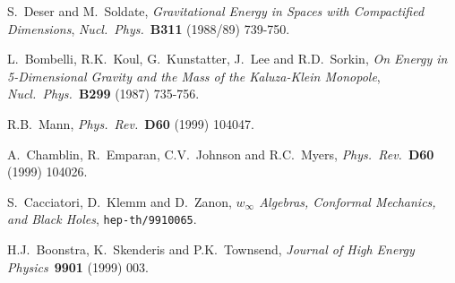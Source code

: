 \documentclass[12pt,a4paper]{article}
\begin{document}
\begin{thebibliography}{99}


 S.~Deser and M.~Soldate,
                {\sl Gravitational Energy in Spaces with Compactified
                Dimensions},
                {\it Nucl.~Phys.}~{\bf B311} (1988/89) 739-750. 

 L.~Bombelli, R.K.~Koul, G.~Kunstatter, 
                   J.~Lee and R.D.~Sorkin,
                   {\sl On Energy in 5-Dimensional Gravity and the Mass
                   of the Kaluza-Klein Monopole},
                   {\it Nucl.~Phys.}~{\bf B299} (1987) 735-756.

 R.B.~Mann,
                  {\it Phys.~Rev.}~{\bf D60} (1999) 104047.

 A.~Chamblin, R.~Emparan, C.V.~Johnson  and R.C.~Myers,
                  {\it Phys.~Rev.}~{\bf D60} (1999) 104026.

 S.~Cacciatori, D.~Klemm and D.~Zanon,
                 {\sl $w_{\infty}$ Algebras, Conformal Mechanics, 
                 and Black Holes},
                 {\tt hep-th/9910065}.





  H.J.~Boonstra, K.~Skenderis and P.K.~Townsend,
                  {\it Journal of High Energy Physics}~{\bf 9901} 
                  (1999) 003.





\end{thebibliography}
\end{document}
